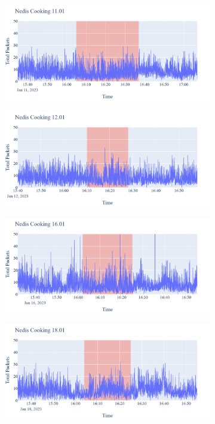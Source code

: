 \begin{figure}[H]
\begin{subfigure}[b]{0.47\textwidth}
        \centering
        \includegraphics[width=1.2\hsize]{figures/Nedis_Cooking_Packets_11.01.png}
    \end{subfigure}
    \begin{subfigure}[b]{0.47\textwidth}
        \centering
        \includegraphics[width=1.2\hsize]{figures/Nedis_Cooking_Packets_12.01.png}
    \end{subfigure}
    \begin{subfigure}[b]{0.47\textwidth}
        \centering
        \includegraphics[width=1.2\hsize]{figures/Nedis_Cooking_Packets_16.01.png}
    \end{subfigure}
    \begin{subfigure}[b]{0.47\textwidth}
        \centering
        \includegraphics[width=1.2\hsize]{figures/Nedis_Cooking_Packets_18.01.png}

\end{subfigure}
\end{figure}
